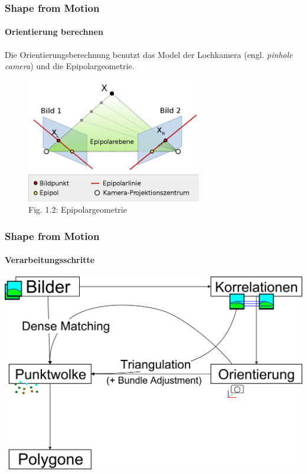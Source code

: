 \documentclass{beamer}
\begin{document}
\begin{frame}
	\frametitle{Shape from Motion}
	\framesubtitle{Orientierung berechnen}

	\vspace{1em}
	Die Orientierungsberechnung benutzt das Model der Lochkamera (engl. \textit{pinhole camera}) und die Epipolargeometrie.

	\begin{figure}
		\includegraphics[width=217pt]{includes/Epipolargeometrie3}\\
		{\scriptsize Fig. 1.2: Epipolargeometrie}
	\end{figure}
\end{frame}


\begin{frame}
	\frametitle{Shape from Motion}
	\framesubtitle{Verarbeitungsschritte}

	\includegraphics[width=\linewidth]{includes/shape-from-motion_process}
\end{frame}
\end{document}
